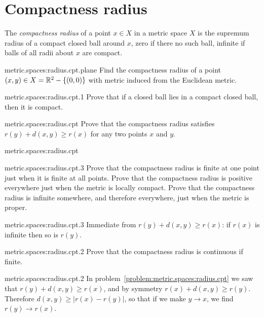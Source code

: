 \section{Compactness radius}
The \emph{compactness radius} of a point \(x \in X\) in a metric space \(X\) is the supremum radius of a compact closed ball around \(x\), zero if there no such ball, infinite if balls of all radii about \(x\) are compact.
\begin{problem}{metric.spaces:radius.cpt.plane}
Find the compactness radius of a point \((x,y) \in X=\mathbb{R}^{2}-\left\{(0,0)\right\}\) with metric induced from the Euclidean metric.
\end{problem}
\begin{problem}{metric.spaces:radius.cpt.1}
Prove that if a closed ball lies in a compact closed ball, then it is compact.
\end{problem}
\begin{problem}{metric.spaces:radius.cpt}
Prove that the compactness radius satisfies \(r(y) + d(x,y) \ge r(x)\) for any two points \(x\) and \(y\).
\end{problem}
\begin{answer}{metric.spaces:radius.cpt}
\end{answer}
\begin{problem}{metric.spaces:radius.cpt.3}
Prove that the compactness radius is finite at one point just when it is finite at all points.
Prove that the compactness radius is positive everywhere just when the metric is locally compact. Prove that the compactness radius is infinite somewhere, and therefore everywhere, just when the metric is proper.
\end{problem}
\begin{answer}{metric.spaces:radius.cpt.3}
Immediate from \(r(y) + d(x,y) \ge r(x)\): if \(r(x)\) is infinite then so is \(r(y)\).
\end{answer}
\begin{problem}{metric.spaces:radius.cpt.2}
Prove that the compactness radius is continuous if finite.
\end{problem}
\begin{answer}{metric.spaces:radius.cpt.2}
In problem~\vref{problem:metric.spaces:radius.cpt} we saw that \(r(y)+d(x,y) \ge r(x)\), and by symmetry \(r(x)+d(x,y) \ge r(y)\).
Therefore \(d(x,y) \ge |r(x)-r(y)|\), so that if we make \(y \to x\), we find \(r(y) \to r(x)\).
\end{answer}
